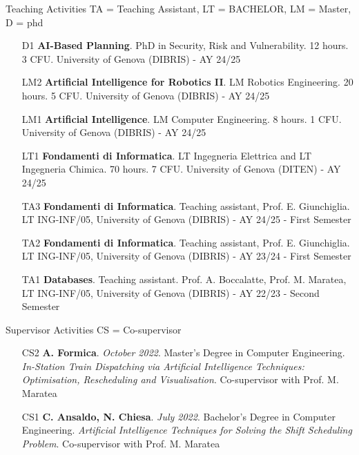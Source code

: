 \documentclass{resume} %
\begin{document}
\begin{rSection}{Teaching Activities {\tiny TA = Teaching Assistant, LT = BACHELOR, LM = Master, D = phd}}
\begin{enumerate}[leftmargin=5mm]
\item[D1] \textbf{AI-Based Planning}. PhD in Security, Risk and Vulnerability. 12 hours. 3 CFU.  University of Genova (DIBRIS) - AY 24/25
\item[LM2] \textbf{Artificial Intelligence for Robotics II}. LM Robotics Engineering. 20 hours. 5 CFU.  University of Genova (DIBRIS) - AY 24/25
\item[LM1] \textbf{Artificial Intelligence}. LM Computer Engineering. 8 hours. 1 CFU.  University of Genova (DIBRIS) - AY 24/25
\item[LT1] \textbf{Fondamenti di Informatica}. LT Ingegneria Elettrica and LT Ingegneria Chimica. 70 hours. 7 CFU.  University of Genova (DITEN) - AY 24/25
\item[TA3] \textbf{Fondamenti di Informatica}. Teaching assistant, Prof. E. Giunchiglia. LT ING-INF/05, University of Genova (DIBRIS) - AY 24/25 - First Semester
\item[TA2] \textbf{Fondamenti di Informatica}. Teaching assistant, Prof. E. Giunchiglia. LT ING-INF/05, University of Genova (DIBRIS) - AY 23/24 - First Semester
\item[TA1] \textbf{Databases}. Teaching assistant. Prof. A. Boccalatte, Prof. M. Maratea, LT ING-INF/05, University of Genova (DIBRIS) - AY 22/23 - Second Semester
\end{enumerate}
\end{rSection}

\begin{rSection}{Supervisor Activities {\tiny CS = Co-supervisor}}
\begin{enumerate}[leftmargin=5mm]
	\item[CS2] \textbf{A. Formica}. \textit{October 2022}. Master's Degree in Computer Engineering. \textit{In-Station Train Dispatching via Artificial Intelligence Techniques: Optimisation, Rescheduling and Visualisation}. Co-supervisor with Prof. M. Maratea 
	\item[CS1] \textbf{C. Ansaldo, N. Chiesa}. \textit{July 2022}. Bachelor's Degree in Computer Engineering. \textit{Artificial Intelligence Techniques for Solving the Shift Scheduling Problem}. Co-supervisor with Prof. M. Maratea
\end{enumerate}
\end{rSection}
\end{document}
